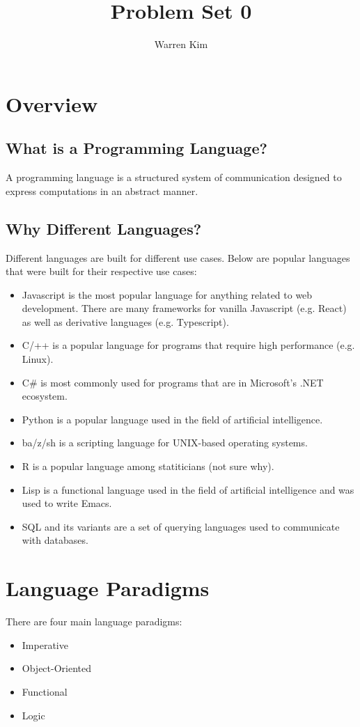 \documentclass[13pt]{article}
\title{Problem Set 0}
\author{Warren Kim}
\begin{document}
\maketitle

\tableofcontents

\newpage
\section{Overview}
\subsection{What is a Programming Language?}
A programming language is a structured system of communication designed to express computations in an 
abstract manner.

\subsection{Why Different Languages?}
Different languages are built for different use cases. Below are popular languages that were built for
their respective use cases:
\begin{itemize}[label=,leftmargin=*]
\item Javascript is the most popular language for anything related to web development. There are many
  frameworks for vanilla Javascript (e.g. React) as well as derivative languages (e.g. Typescript).
\item C/++ is a popular language for programs that require high performance (e.g. Linux).
\item C\# is most commonly used for programs that are in Microsoft's .NET ecosystem.
\item Python is a popular language used in the field of artificial intelligence.
\item ba/z/sh is a scripting language for UNIX-based operating systems.
\item R is a popular language among statiticians (not sure why).
\item Lisp is a functional language used in the field of artificial intelligence and was used to 
  write Emacs.
\item SQL and its variants are a set of querying languages used to communicate with databases.
\end{itemize}

\section{Language Paradigms}
There are four main language paradigms:
\begin{itemize}[label=,leftmargin=*]
\item Imperative
\item Object-Oriented
\item Functional
\item Logic
\end{itemize}
\end{document}
